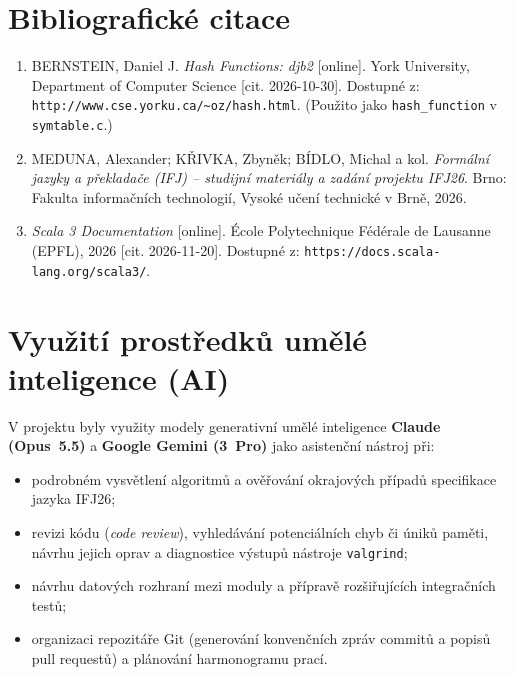 \documentclass[11pt, a4paper]{article}
\begin{document}
\newpage
\section{Bibliografické citace}
\begin{enumerate}[topsep=4pt, itemsep=4pt]
  \item BERNSTEIN, Daniel J. \textit{Hash Functions: djb2} [online]. York University, Department of Computer Science [cit. 2026-10-30]. Dostupné z: \texttt{http://www.cse.yorku.ca/\textasciitilde{}oz/hash.html}. (Použito jako \texttt{hash\_function} v \texttt{symtable.c}.)
  \item MEDUNA, Alexander; KŘIVKA, Zbyněk; BÍDLO, Michal a kol. \textit{Formální jazyky a překladače (IFJ) -- studijní materiály a zadání projektu IFJ26}. Brno: Fakulta informačních technologií, Vysoké učení technické v Brně, 2026.
  \item \textit{Scala 3 Documentation} [online]. École Polytechnique Fédérale de Lausanne (EPFL), 2026 [cit. 2026-11-20]. Dostupné z: \texttt{https://docs.scala-lang.org/scala3/}.
\end{enumerate}
\section{Využití prostředků umělé inteligence (AI)}

V projektu byly využity modely generativní umělé inteligence \textbf{Claude (Opus~5.5)} a \textbf{Google Gemini (3~Pro)} jako asistenční nástroj při:
\begin{itemize}[topsep=2pt, itemsep=2pt]
  \item podrobném vysvětlení algoritmů a ověřování okrajových případů specifikace jazyka IFJ26;
  \item revizi kódu (\textit{code review}), vyhledávání potenciálních chyb či úniků paměti, návrhu jejich oprav a diagnostice výstupů nástroje \texttt{valgrind};
  \item návrhu datových rozhraní mezi moduly a přípravě rozšiřujících integračních testů;
  \item organizaci repozitáře Git (generování konvenčních zpráv commitů a popisů pull requestů) a plánování harmonogramu prací.
\end{itemize}
\end{document}
